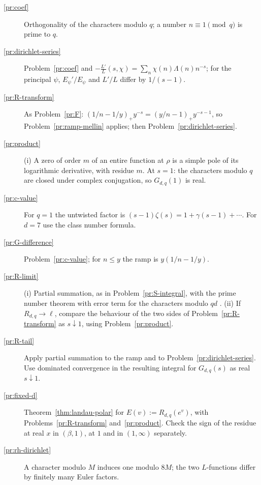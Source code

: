 \documentclass[reqno]{amsart}
\theoremstyle{definition}
\theoremstyle{plain}
\begin{document}
\begin{description}
\item[\ref{pr:coef}] Orthogonality of the characters modulo $q$; a number $n \equiv 1 \pmod q$ is prime to $q$.
\item[\ref{pr:dirichlet-series}] Problem~\ref{pr:coef} and $-\frac{L'}{L}(s, \chi) = \sum_n \chi(n)\Lambda(n) n^{-s}$; for the principal $\psi$, $E_\psi'/E_\psi$ and $L'/L$ differ by $1/(s-1)$.
\item[\ref{pr:R-transform}] As Problem~\ref{pr:F}: $(1/n - 1/y)_+ y^{-s} = (y/n - 1)_+ y^{-s-1}$, so Problem~\ref{pr:ramp-mellin} applies; then Problem~\ref{pr:dirichlet-series}.
\item[\ref{pr:product}] (i) A zero of order $m$ of an entire function at $\rho$ is a simple pole of its logarithmic derivative, with residue $m$.  At $s = 1$: the characters modulo $q$ are closed under complex conjugation, so $G_{d,q}(1)$ is real.
\item[\ref{pr:c-value}] For $q = 1$ the untwisted factor is $(s-1)\zeta(s) = 1 + \gamma(s - 1) + \cdots$.  For $d = 7$ use the class number formula.
\item[\ref{pr:G-difference}] Problem~\ref{pr:c-value}; for $n \le y$ the ramp is $y(1/n - 1/y)$.
\item[\ref{pr:R-limit}] (i) Partial summation, as in Problem~\ref{pr:S-integral}, with the prime number theorem with error term for the characters modulo $qd$ \cite[Ch.~20]{Dav}.  (ii) If $R_{d,q} \to \ell$, compare the behaviour of the two sides of Problem~\ref{pr:R-transform} as $s \downarrow 1$, using Problem~\ref{pr:product}.
\item[\ref{pr:R-tail}] Apply partial summation to the ramp and to Problem~\ref{pr:dirichlet-series}.  Use dominated convergence in the resulting integral for $G_{d,q}(s)$ as real $s \downarrow 1$.
\item[\ref{pr:fixed-d}] Theorem~\ref{thm:landau-polar} for $E(v) := R_{d,q}(e^v)$, with Problems~\ref{pr:R-transform} and~\ref{pr:product}.  Check the sign of the residue at real $x$ in $(\beta, 1)$, at $1$ and in $(1, \infty)$ separately.
\item[\ref{pr:rh-dirichlet}] A character modulo $M$ induces one modulo $8M$; the two $L$-functions differ by finitely many Euler factors.
\end{description}
\end{document}
